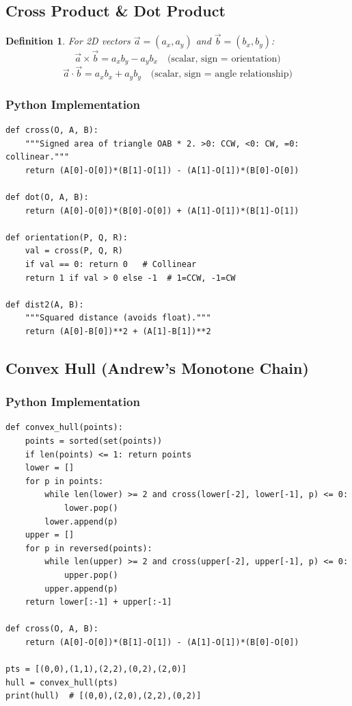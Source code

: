 \documentclass[10pt,a4paper]{article}
\theoremstyle{cpstyle}
\newtheorem{definition}[theorem]{Definition}
\begin{document}
\subsection{Cross Product \& Dot Product}

\begin{definition}
For 2D vectors $\vec{a}=(a_x,a_y)$ and $\vec{b}=(b_x,b_y)$:
\[
  \vec{a} \times \vec{b} = a_x b_y - a_y b_x \quad \text{(scalar, sign = orientation)}
\]
\[
  \vec{a} \cdot \vec{b} = a_x b_x + a_y b_y \quad \text{(scalar, sign = angle relationship)}
\]
\end{definition}

\subsubsection{Python Implementation}
\begin{lstlisting}[caption={Cross product, dot product, orientation test}]
def cross(O, A, B):
    """Signed area of triangle OAB * 2. >0: CCW, <0: CW, =0: collinear."""
    return (A[0]-O[0])*(B[1]-O[1]) - (A[1]-O[1])*(B[0]-O[0])

def dot(O, A, B):
    return (A[0]-O[0])*(B[0]-O[0]) + (A[1]-O[1])*(B[1]-O[1])

def orientation(P, Q, R):
    val = cross(P, Q, R)
    if val == 0: return 0   # Collinear
    return 1 if val > 0 else -1  # 1=CCW, -1=CW

def dist2(A, B):
    """Squared distance (avoids float)."""
    return (A[0]-B[0])**2 + (A[1]-B[1])**2
\end{lstlisting}

\subsection{Convex Hull (Andrew's Monotone Chain)}

\subsubsection{Python Implementation}
\begin{lstlisting}[caption={Convex Hull -- Andrew's Monotone Chain O(n log n)}]
def convex_hull(points):
    points = sorted(set(points))
    if len(points) <= 1: return points
    lower = []
    for p in points:
        while len(lower) >= 2 and cross(lower[-2], lower[-1], p) <= 0:
            lower.pop()
        lower.append(p)
    upper = []
    for p in reversed(points):
        while len(upper) >= 2 and cross(upper[-2], upper[-1], p) <= 0:
            upper.pop()
        upper.append(p)
    return lower[:-1] + upper[:-1]

def cross(O, A, B):
    return (A[0]-O[0])*(B[1]-O[1]) - (A[1]-O[1])*(B[0]-O[0])

pts = [(0,0),(1,1),(2,2),(0,2),(2,0)]
hull = convex_hull(pts)
print(hull)  # [(0,0),(2,0),(2,2),(0,2)]
\end{lstlisting}
\end{document}
